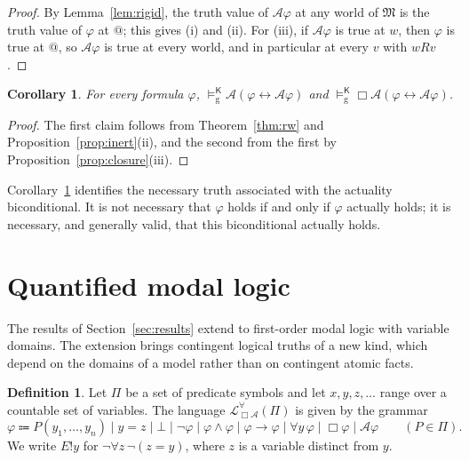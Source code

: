 \documentclass[11pt]{amsart}
\makeatletter
\theoremstyle{plain}
\newtheorem{corollary}[theorem]{Corollary}
\theoremstyle{definition}
\newtheorem{definition}[theorem]{Definition}
\theoremstyle{remark}
\newcommand{\Act}{\mathcal{A}}
\newcommand{\Lang}{\mathcal{L}_{\Box\Act}}
\newcommand{\Mod}{\mathfrak{M}}
\newcommand{\Kl}{\mathsf{K}}
\newcommand{\at}{@}
\newcommand{\Gv}[1]{\models^{#1}_{\mathrm{g}}}
\makeatother
\begin{document}
\begin{proof}
By Lemma~\ref{lem:rigid}, the truth value of $\Act\varphi$ at any world
of $\Mod$ is the truth value of $\varphi$ at $\at$; this gives (i) and
(ii). For (iii), if $\Act\varphi$ is true at $w$, then $\varphi$ is
true at $\at$, so $\Act\varphi$ is true at every world, and in
particular at every $v$ with $wRv$.
\end{proof}

\begin{corollary}
\label{cor:actually-necessary}
For every formula $\varphi$,
$\Gv{\Kl} \Act(\varphi \leftrightarrow \Act\varphi)$ and
$\Gv{\Kl} \Box\Act(\varphi \leftrightarrow \Act\varphi)$.
\end{corollary}

\begin{proof}
The first claim follows from Theorem~\ref{thm:rw} and
Proposition~\ref{prop:inert}(ii), and the second from the first by
Proposition~\ref{prop:closure}(iii).
\end{proof}

Corollary~\ref{cor:actually-necessary} identifies the necessary truth
associated with the actuality biconditional. It is not necessary that
$\varphi$ holds if and only if $\varphi$ actually holds; it is
necessary, and generally valid, that this biconditional actually holds.

\section{Quantified modal logic}
\label{sec:quantified}

The results of Section~\ref{sec:results} extend to first-order modal
logic with variable domains. The extension brings contingent logical
truths of a new kind, which depend on the domains of a model rather
than on contingent atomic facts.

\begin{definition}
Let $\Pi$ be a set of predicate symbols and let $x, y, z, \ldots$
range over a countable set of variables. The language $\Lang^\forall(\Pi)$
is given by the grammar
\[
  \varphi \Coloneqq P(y_1, \ldots, y_n) \mid y = z \mid \bot \mid
  \neg\varphi \mid \varphi \wedge \varphi \mid \varphi \to \varphi \mid
  \forall y\,\varphi \mid \Box\varphi \mid \Act\varphi
  \qquad (P \in \Pi).
\]
We write $E!y$ for $\neg\forall z\,\neg(z = y)$, where $z$ is a
variable distinct from $y$.
\end{definition}
\end{document}
